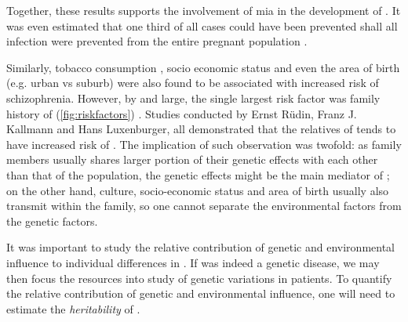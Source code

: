	Together, these results supports the involvement of \gls{mia} in the development of .
	It was even estimated that one third of all  cases could have been prevented shall all infection were prevented from the entire pregnant population \citep{Brown2010}.
	
	Similarly, tobacco consumption \citep{Kelly1999}, socio economic status and even the area of birth (e.g. urban vs suburb) were also found to be associated with increased risk of schizophrenia\citep{McGrath2008a}.
	However, by and large, the single largest risk factor was family history of (\cref{fig:riskfactors}) \citep{Sullivan2005}.
	Studies conducted by Ernst R{\"u}din, Franz J. Kallmann and Hans Luxenburger, all demonstrated that the relatives of  tends to have increased risk of \citep{Gottesman1982}. 
	The implication of such observation was twofold:
	as family members usually shares larger portion of their genetic effects with each other than that of the population, the genetic effects might be the main mediator of ; 
	on the other hand, culture, socio-economic status and area of birth usually also transmit within the family, so one cannot separate the environmental factors from the genetic factors.


	It was important to study the relative contribution of genetic and environmental influence to individual differences in .
	If  was indeed a genetic disease, we may then focus the resources into study of genetic variations in  patients. 
	To quantify the relative contribution of genetic and environmental influence, one will need to estimate the \emph{heritability} of .
	